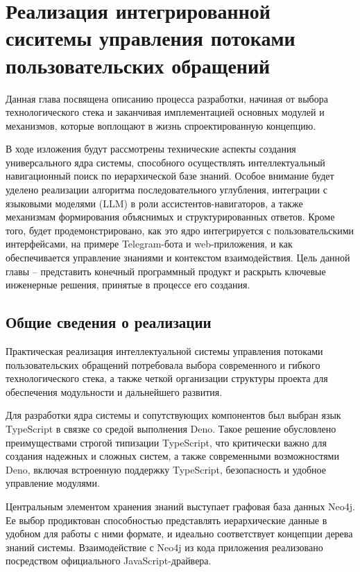\section{Реализация интегрированной сиситемы управления потоками пользовательских обращений}
\label{sec:development}

Данная глава посвящена описанию процесса разработки, начиная от выбора технологического стека и заканчивая имплементацией основных модулей и механизмов, которые воплощают в жизнь спроектированную концепцию.

В ходе изложения будут рассмотрены технические аспекты создания универсального ядра системы, способного осуществлять интеллектуальный навигационный поиск по иерархической базе знаний. Особое внимание будет уделено реализации алгоритма последовательного углубления, интеграции с языковыми моделями (LLM) в роли ассистентов-навигаторов, а также механизмам формирования объяснимых и структурированных ответов. Кроме того, будет продемонстрировано, как это ядро интегрируется с пользовательскими интерфейсами, на примере Telegram-бота и web-приложения, и как обеспечивается управление знаниями и контекстом взаимодействия. Цель данной главы -- представить конечный программный продукт и раскрыть ключевые инженерные решения, принятые в процессе его создания.

\subsection{Общие сведения о реализации}

Практическая реализация интеллектуальной системы управления потоками пользовательских обращений потребовала выбора современного и гибкого технологического стека, а также четкой организации структуры проекта для обеспечения модульности и дальнейшего развития.

Для разработки ядра системы и сопутствующих компонентов был выбран язык TypeScript\cite{TypeScript} в связке со средой выполнения Deno. Такое решение обусловлено преимуществами строгой типизации TypeScript, что критически важно для создания надежных и сложных систем, а также современными возможностями Deno, включая встроенную поддержку TypeScript, безопасность и удобное управление модулями.

Центральным элементом хранения знаний выступает графовая база данных Neo4j. Ее выбор продиктован способностью представлять иерархические данные в удобном для работы с ними формате, и идеально соответствует концепции дерева знаний системы. Взаимодействие с Neo4j из кода приложения реализовано посредством официального JavaScript-драйвера\cite{js}.

